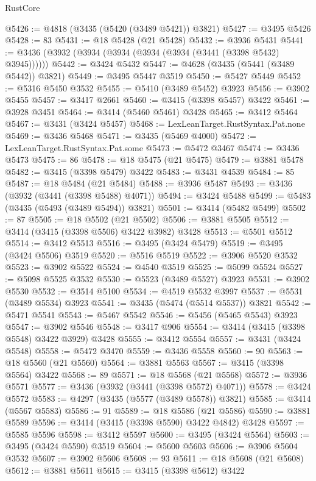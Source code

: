 \begin{lexlean}{RustCore}
\begin{coremodule}
@5426 := @4818 (@3435 (@5420 (@3489 @5421)) @3821)
@5427 := @3495 @5426
@5428 := 83
@5431 := @18 @5428 (@21 @5428)
@5432 := @3936 @5431
@5441 := @3436 (@3932 (@3934 (@3934 (@3934 (@3934 (@3441 (@3398 @5432) @3945))))))
@5442 := @3424 @5432
@5447 := @4628 (@3435 (@5441 (@3489 @5442)) @3821)
@5449 := @3495 @5447 @3519
@5450 := @5427 @5449
@5452 := @5316 @5450 @3532
@5455 := @5410 (@3489 @5452) @3923
@5456 := @3902 @5455
@5457 := @3417 @2661
@5460 := @3415 (@3398 @5457) @3422
@5461 := @3928 @3451
@5464 := @3414 (@5460 @5461) @3428
@5465 := @3412 @5464
@5467 := @3431 (@3424 @5457)
@5468 := LexLeanTarget.RustSyntax.Pat.none
@5469 := @3436 @5468
@5471 := @3435 (@5469 @4000)
@5472 := LexLeanTarget.RustSyntax.Pat.some
@5473 := @5472 @3467
@5474 := @3436 @5473
@5475 := 86
@5478 := @18 @5475 (@21 @5475)
@5479 := @3881 @5478
@5482 := @3415 (@3398 @5479) @3422
@5483 := @3431 @4539
@5484 := 85
@5487 := @18 @5484 (@21 @5484)
@5488 := @3936 @5487
@5493 := @3436 (@3932 (@3441 (@3398 @5488) @4071))
@5494 := @3424 @5488
@5499 := @5483 (@3435 (@5493 (@3489 @5494)) @3821)
@5501 := @3414 (@5482 @5499)
@5502 := 87
@5505 := @18 @5502 (@21 @5502)
@5506 := @3881 @5505
@5512 := @3414 (@3415 (@3398 @5506) @3422 @3982) @3428
@5513 := @5501 @5512
@5514 := @3412 @5513
@5516 := @3495 (@3424 @5479)
@5519 := @3495 (@3424 @5506) @3519
@5520 := @5516 @5519
@5522 := @3906 @5520 @3532
@5523 := @3902 @5522
@5524 := @4540 @3519
@5525 := @5099 @5524
@5527 := @5098 @5525 @3532
@5530 := @5523 (@3489 @5527) @3923
@5531 := @3902 @5530
@5532 := @3514 @5100
@5534 := @4519 @5532 @3997
@5537 := @5531 (@3489 @5534) @3923
@5541 := @3435 (@5474 (@5514 @5537)) @3821
@5542 := @5471 @5541
@5543 := @5467 @5542
@5546 := @5456 (@5465 @5543) @3923
@5547 := @3902 @5546
@5548 := @3417 @906
@5554 := @3414 (@3415 (@3398 @5548) @3422 @3929) @3428
@5555 := @3412 @5554
@5557 := @3431 (@3424 @5548)
@5558 := @5472 @3470
@5559 := @3436 @5558
@5560 := 90
@5563 := @18 @5560 (@21 @5560)
@5564 := @3881 @5563
@5567 := @3415 (@3398 @5564) @3422
@5568 := 89
@5571 := @18 @5568 (@21 @5568)
@5572 := @3936 @5571
@5577 := @3436 (@3932 (@3441 (@3398 @5572) @4071))
@5578 := @3424 @5572
@5583 := @4297 (@3435 (@5577 (@3489 @5578)) @3821)
@5585 := @3414 (@5567 @5583)
@5586 := 91
@5589 := @18 @5586 (@21 @5586)
@5590 := @3881 @5589
@5596 := @3414 (@3415 (@3398 @5590) @3422 @4842) @3428
@5597 := @5585 @5596
@5598 := @3412 @5597
@5600 := @3495 (@3424 @5564)
@5603 := @3495 (@3424 @5590) @3519
@5604 := @5600 @5603
@5606 := @3906 @5604 @3532
@5607 := @3902 @5606
@5608 := 93
@5611 := @18 @5608 (@21 @5608)
@5612 := @3881 @5611
@5615 := @3415 (@3398 @5612) @3422

\end{coremodule}
\end{lexlean}
